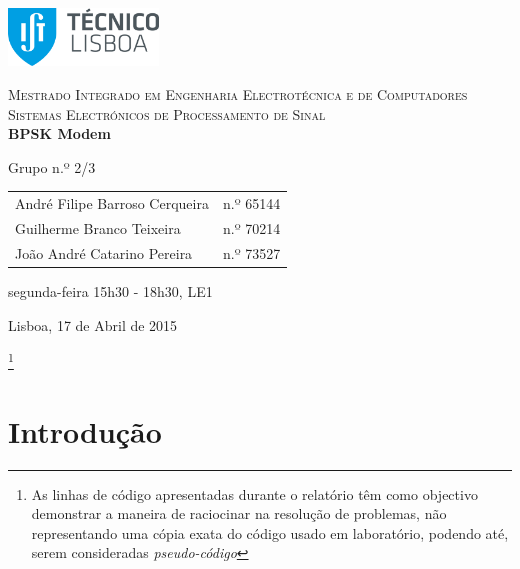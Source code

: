 \documentclass[11pt]{article}
\begin{document}
\linespread{1.3}
\begin{titlepage}
	\begin{center}
		
		\hfill \break
		\hfill \break
		
		\includegraphics[width=0.3\textwidth]{logo.png}
		
		\textsc{\Large Mestrado Integrado em Engenharia Electrotécnica e de Computadores}\\[1.5cm]
		\textsc{\huge Sistemas Electrónicos de Processamento de Sinal}\\[0.25cm]
		
		{\huge \bfseries BPSK Modem \\[1.2cm]}
		
		Grupo n.º 2/3 \vspace{0.3cm}
		
		\begin{tabular}{l r}
			André Filipe Barroso Cerqueira \hspace{1mm} & n.º 65144 \\
			Guilherme Branco Teixeira \hspace{1mm} & n.º 70214  \\
			João André Catarino Pereira & n.º 73527
		\end{tabular}
		
		\hfill
		\hfill
		
		segunda-feira 15h30 - 18h30, LE1
		
	
		\vfill
		
		{\large Lisboa, 17 de Abril de 2015} 
		
	\end{center}
\end{titlepage}
\clearpage

	\footnote{As linhas de código apresentadas durante o relatório têm como objectivo demonstrar a maneira de raciocinar na resolução de problemas, não representando uma cópia exata do código usado em laboratório, podendo até, serem consideradas \textit{pseudo-código}}
	
\tableofcontents
\pagebreak

\clearpage
{}

\section{Introdução}
\end{document}
